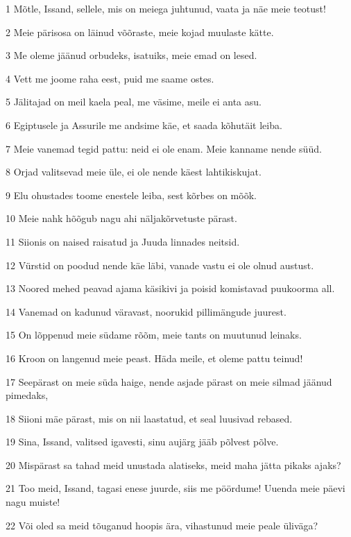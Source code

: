 \par 1 Mõtle, Issand, sellele, mis on meiega juhtunud, vaata ja näe meie teotust!
\par 2 Meie pärisosa on läinud võõraste, meie kojad muulaste kätte.
\par 3 Me oleme jäänud orbudeks, isatuiks, meie emad on lesed.
\par 4 Vett me joome raha eest, puid me saame ostes.
\par 5 Jälitajad on meil kaela peal, me väsime, meile ei anta asu.
\par 6 Egiptusele ja Assurile me andsime käe, et saada kõhutäit leiba.
\par 7 Meie vanemad tegid pattu: neid ei ole enam. Meie kanname nende süüd.
\par 8 Orjad valitsevad meie üle, ei ole nende käest lahtikiskujat.
\par 9 Elu ohustades toome enestele leiba, sest kõrbes on mõõk.
\par 10 Meie nahk hõõgub nagu ahi näljakõrvetuste pärast.
\par 11 Siionis on naised raisatud ja Juuda linnades neitsid.
\par 12 Vürstid on poodud nende käe läbi, vanade vastu ei ole olnud austust.
\par 13 Noored mehed peavad ajama käsikivi ja poisid komistavad puukoorma all.
\par 14 Vanemad on kadunud väravast, noorukid pillimängude juurest.
\par 15 On lõppenud meie südame rõõm, meie tants on muutunud leinaks.
\par 16 Kroon on langenud meie peast. Häda meile, et oleme pattu teinud!
\par 17 Seepärast on meie süda haige, nende asjade pärast on meie silmad jäänud pimedaks,
\par 18 Siioni mäe pärast, mis on nii laastatud, et seal luusivad rebased.
\par 19 Sina, Issand, valitsed igavesti, sinu aujärg jääb põlvest põlve.
\par 20 Mispärast sa tahad meid unustada alatiseks, meid maha jätta pikaks ajaks?
\par 21 Too meid, Issand, tagasi enese juurde, siis me pöördume! Uuenda meie päevi nagu muiste!
\par 22 Või oled sa meid tõuganud hoopis ära, vihastunud meie peale üliväga?



